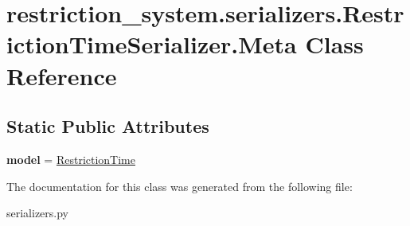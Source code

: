\hypertarget{classrestriction__system_1_1serializers_1_1RestrictionTimeSerializer_1_1Meta}{}\section{restriction\+\_\+system.\+serializers.\+Restriction\+Time\+Serializer.\+Meta Class Reference}
\label{classrestriction__system_1_1serializers_1_1RestrictionTimeSerializer_1_1Meta}
\subsection*{Static Public Attributes}
\begin{DoxyCompactItemize}
\item 
\hypertarget{classrestriction__system_1_1serializers_1_1RestrictionTimeSerializer_1_1Meta_a4fb0d10470f0a8f54bd22f001b3f5771}{}{\bfseries model} = \hyperlink{classrestriction__system_1_1models_1_1RestrictionTime}{Restriction\+Time}\label{classrestriction__system_1_1serializers_1_1RestrictionTimeSerializer_1_1Meta_a4fb0d10470f0a8f54bd22f001b3f5771}

\end{DoxyCompactItemize}


The documentation for this class was generated from the following file\+:\begin{DoxyCompactItemize}
\item 
serializers.\+py\end{DoxyCompactItemize}
